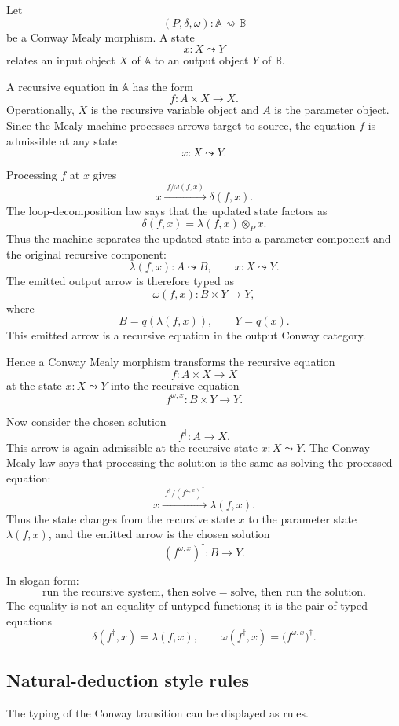 Let
\[
(P,\delta,\omega):\mathbb A\rightsquigarrow\mathbb B
\]
be a Conway Mealy morphism.  A state
\[
x:X\leadsto Y
\]
relates an input object \(X\) of \(\mathbb A\) to an output object \(Y\) of
\(\mathbb B\).

A recursive equation in \(\mathbb A\) has the form
\[
f:A\times X\to X.
\]
Operationally, \(X\) is the recursive variable object and \(A\) is the
parameter object.  Since the Mealy machine processes arrows target-to-source,
the equation \(f\) is admissible at any state
\[
x:X\leadsto Y.
\]

Processing \(f\) at \(x\) gives
\[
x
\xrightarrow{\;f/\omega(f,x)\;}
\delta(f,x).
\]
The loop-decomposition law says that the updated state factors as
\[
\delta(f,x)=\lambda(f,x)\otimes_P x.
\]
Thus the machine separates the updated state into a parameter component and
the original recursive component:
\[
\lambda(f,x):A\leadsto B,
\qquad
x:X\leadsto Y.
\]
The emitted output arrow is therefore typed as
\[
\omega(f,x):B\times Y\to Y,
\]
where
\[
B=q(\lambda(f,x)),
\qquad
Y=q(x).
\]
This emitted arrow is a recursive equation in the output Conway category.

Hence a Conway Mealy morphism transforms the recursive equation
\[
f:A\times X\to X
\]
at the state \(x:X\leadsto Y\) into the recursive equation
\[
f^{\omega,x}:B\times Y\to Y.
\]

Now consider the chosen solution
\[
f^\dagger:A\to X.
\]
This arrow is again admissible at the recursive state \(x:X\leadsto Y\).  The
Conway Mealy law says that processing the solution is the same as solving the
processed equation:
\[
x
\xrightarrow{\;f^\dagger/(f^{\omega,x})^\dagger\;}
\lambda(f,x).
\]
Thus the state changes from the recursive state \(x\) to the parameter state
\(\lambda(f,x)\), and the emitted arrow is the chosen solution
\[
(f^{\omega,x})^\dagger:B\to Y.
\]

In slogan form:
\[
\boxed{
\text{run the recursive system, then solve}
=
\text{solve, then run the solution}.
}
\]
The equality is not an equality of untyped functions; it is the pair of typed
equations
\[
\delta(f^\dagger,x)=\lambda(f,x),
\qquad
\omega(f^\dagger,x)=\bigl(f^{\omega,x}\bigr)^\dagger.
\]

\subsection{Natural-deduction style rules}
\label{subsec:natural-deduction-conway-mealy}

The typing of the Conway transition can be displayed as rules.


